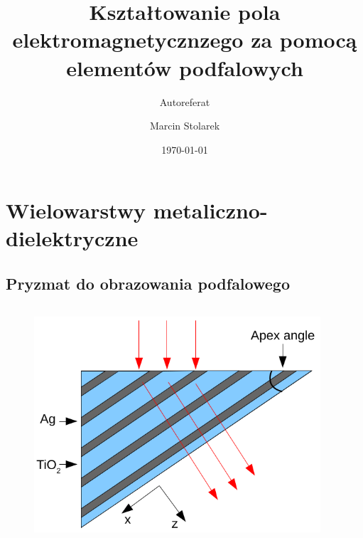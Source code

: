 \documentclass{beamer}
\title{Kształtowanie pola elektromagnetycznzego za pomocą elementów podfalowych}
\subtitle{Autoreferat}
\author{Marcin Stolarek}
\institute{Zakład Optyki Informacyjnej, Wydział Fizyki UW}
\date{\today}
\begin{document}
\frame{\titlepage}

\frame{\tableofcontents}

\section{Wielowarstwy metaliczno-dielektryczne}
\subsection{Pryzmat do obrazowania podfalowego}
\begin{frame}
	\begin{columns}
		\begin{column}{0.5\textwidth}
			\begin{figure}
				\includegraphics[width=\textwidth]{../images/multilayer/prism.png}
			\end{figure}
		\end{column}
		\begin{column}{0.5\textwidth}
		\end{column}
	\end{columns}
		
\end{frame}
\end{document}
